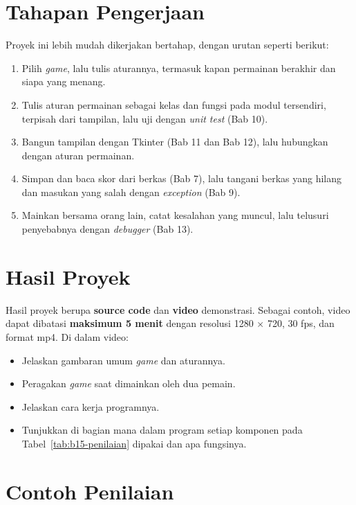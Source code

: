\section{Tahapan Pengerjaan}

Proyek ini lebih mudah dikerjakan bertahap, dengan urutan seperti berikut:

\begin{enumerate}
  \item Pilih \textit{game}, lalu tulis aturannya, termasuk kapan permainan berakhir dan siapa yang menang.
  \item Tulis aturan permainan sebagai kelas dan fungsi pada modul tersendiri, terpisah dari tampilan, lalu uji dengan \textit{unit test} (Bab 10).
  \item Bangun tampilan dengan Tkinter (Bab 11 dan Bab 12), lalu hubungkan dengan aturan permainan.
  \item Simpan dan baca skor dari berkas (Bab 7), lalu tangani berkas yang hilang dan masukan yang salah dengan \textit{exception} (Bab 9).
  \item Mainkan bersama orang lain, catat kesalahan yang muncul, lalu telusuri penyebabnya dengan \textit{debugger} (Bab 13).
\end{enumerate}

\section{Hasil Proyek}

Hasil proyek berupa \textbf{source code} dan \textbf{video} demonstrasi. Sebagai contoh, video dapat dibatasi \textbf{maksimum 5 menit} dengan resolusi 1280 $\times$ 720, 30 fps, dan format mp4. Di dalam video:
\begin{itemize}
  \item Jelaskan gambaran umum \textit{game} dan aturannya.
  \item Peragakan \textit{game} saat dimainkan oleh dua pemain.
  \item Jelaskan cara kerja programnya.
  \item Tunjukkan di bagian mana dalam program setiap komponen pada Tabel~\ref{tab:b15-penilaian} dipakai dan apa fungsinya.
\end{itemize}

\section{Contoh Penilaian}

